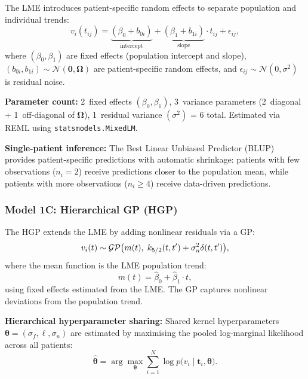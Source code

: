 The LME introduces patient-specific random effects to separate population
and individual trends:
\begin{equation}
  v_i(t_{ij}) = \underbrace{(\beta_0 + b_{0i})}_{\text{intercept}}
    + \underbrace{(\beta_1 + b_{1i})}_{\text{slope}} \cdot t_{ij}
    + \epsilon_{ij},
  \label{eq:lme_vol}
\end{equation}
where $(\beta_0, \beta_1)$ are fixed effects (population intercept and
slope), $(b_{0i}, b_{1i}) \sim \mathcal{N}(\mathbf{0}, \boldsymbol{\Omega})$
are patient-specific random effects, and
$\epsilon_{ij} \sim \mathcal{N}(0, \sigma^2)$ is residual noise.

\textbf{Parameter count:} 2~fixed effects $(\beta_0, \beta_1)$, 3~variance
parameters (2~diagonal + 1~off-diagonal of $\boldsymbol{\Omega}$),
1~residual variance $(\sigma^2)$ = 6 total. Estimated via REML using
\texttt{statsmodels.MixedLM}.

\textbf{Single-patient inference:} The Best Linear Unbiased Predictor (BLUP)
\cite{robinson1991blup} provides patient-specific predictions with automatic
shrinkage: patients with few observations ($n_i = 2$) receive predictions
closer to the population mean, while patients with more observations
($n_i \geq 4$) receive data-driven predictions.

\subsubsection{Model 1C: Hierarchical GP (HGP)}

The HGP extends the LME by adding nonlinear residuals via a GP:
\begin{equation}
  v_i(t) \sim \mathcal{GP}\bigl(m(t),\; k_{5/2}(t, t') + \sigma_n^2 \delta(t, t')\bigr),
  \label{eq:hgp_vol}
\end{equation}
where the mean function is the LME population trend:
\begin{equation}
  m(t) = \hat{\beta}_0 + \hat{\beta}_1 \cdot t,
  \label{eq:gp_mean_lme}
\end{equation}
using fixed effects estimated from the LME. The GP captures nonlinear
deviations from the population trend.

\textbf{Hierarchical hyperparameter sharing:} Shared kernel hyperparameters
$\boldsymbol{\theta} = (\sigma_f, \ell, \sigma_n)$ are estimated by
maximising the pooled log-marginal likelihood across all patients:
\begin{equation}
  \hat{\boldsymbol{\theta}} = \arg\max_{\boldsymbol{\theta}}
    \sum_{i=1}^{N} \log p\bigl(v_i \mid
    \mathbf{t}_i, \boldsymbol{\theta}\bigr).
  \label{eq:pooled_marglik}
\end{equation}

